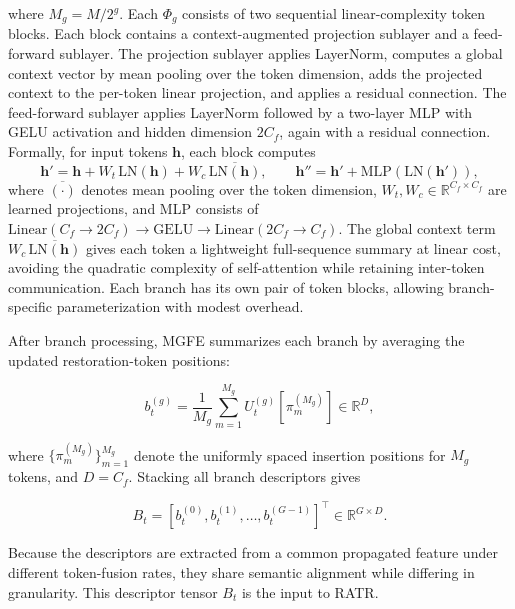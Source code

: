 \documentclass[symmetry,article,submit,pdftex,moreauthors]{Definitions/mdpi}
\begin{document}
where $M_g = M/2^g$. Each $\Phi_g$ consists of two sequential linear-complexity token blocks. Each block contains a context-augmented projection sublayer and a feed-forward sublayer. The projection sublayer applies LayerNorm, computes a global context vector by mean pooling over the token dimension, adds the projected context to the per-token linear projection, and applies a residual connection. The feed-forward sublayer applies LayerNorm followed by a two-layer MLP with GELU activation and hidden dimension $2C_f$, again with a residual connection. Formally, for input tokens $\mathbf{h}$, each block computes
\begin{equation}
\mathbf{h}' = \mathbf{h} + W_t\,\mathrm{LN}(\mathbf{h}) + W_c\,\overline{\mathrm{LN}(\mathbf{h})},\qquad
\mathbf{h}'' = \mathbf{h}' + \mathrm{MLP}(\mathrm{LN}(\mathbf{h}')),
\end{equation}
where $\overline{(\cdot)}$ denotes mean pooling over the token dimension, $W_t,W_c\in\mathbb{R}^{C_f\times C_f}$ are learned projections, and MLP consists of $\mathrm{Linear}(C_f\!\rightarrow\!2C_f)\!\rightarrow\!\mathrm{GELU}\!\rightarrow\!\mathrm{Linear}(2C_f\!\rightarrow\!C_f)$. The global context term $W_c\,\overline{\mathrm{LN}(\mathbf{h})}$ gives each token a lightweight full-sequence summary at linear cost, avoiding the quadratic complexity of self-attention while retaining inter-token communication. Each branch has its own pair of token blocks, allowing branch-specific parameterization with modest overhead.

After branch processing, MGFE summarizes each branch by averaging the updated restoration-token positions:

\begin{equation}
b_t^{(g)} =
\frac{1}{M_g}
\sum_{m=1}^{M_g}
U_t^{(g)}[\pi_m^{(M_g)}]
\in \mathbb{R}^{D},
\end{equation}

where $\{\pi_m^{(M_g)}\}_{m=1}^{M_g}$ denote the uniformly spaced insertion positions for $M_g$ tokens, and $D=C_f$. Stacking all branch descriptors gives

\begin{equation}
B_t =
\left[
b_t^{(0)}, b_t^{(1)}, \ldots, b_t^{(G-1)}
\right]^\top
\in \mathbb{R}^{G \times D}.
\end{equation}

Because the descriptors are extracted from a common propagated feature under different token-fusion rates, they share semantic alignment while differing in granularity. This descriptor tensor $B_t$ is the input to RATR.
\end{document}
